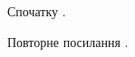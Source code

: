 \documentclass{article}
\begin{document}
Спочатку \cite{first,second}.

Повторне посилання \cite{first}.


\end{document}
